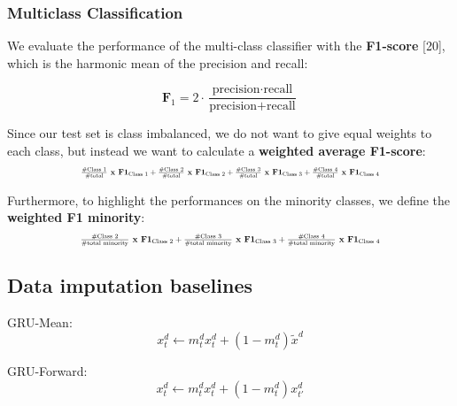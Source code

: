 \documentclass{article}
\begin{document}
\subsubsection*{\large Multiclass Classification}

We evaluate the performance of the multi-class classifier with the \textbf{F1-score} [20], which is the harmonic mean of the precision and recall:  

\begin{equation}
\textbf{F}_{1} = 2 \cdot \frac{\text{precision} \cdot \text{recall}}{ \text{precision} + \text{recall}}  
\end{equation}

\noindent Since our test set is class imbalanced, we do not want to give equal weights to each class, but instead we want to calculate a \textbf{weighted average F1-score}:  
\begin{equation}
\resizebox{0.7\hsize}{!}{$\frac{\#  \text{Class 1}}{\# \text{total}} \textbf{ x } \textbf{F1}_{\text{Class 1}} + \frac{\#  \text{Class 2}}{\# \text{total}} \textbf{ x } \textbf{F1}_{\text{Class 2}} + \frac{\#  \text{Class 3}}{\# \text{total}} \textbf{ x } \textbf{F1}_{\text{Class 3}} +  \frac{\#  \text{Class 4}}{\# \text{total}} \textbf{ x } \textbf{F1}_{\text{Class 4}}$}
\end{equation} 

\noindent Furthermore, to highlight the performances on the minority classes, we define the \textbf{weighted F1 minority}:
\begin{equation*}
\resizebox{0.7\hsize}{!}{$\frac{\#  \text{Class 2}}{\# \text{total minority}} \textbf{ x } \textbf{F1}_{\text{Class 2}} + \frac{\#  \text{Class 3}}{\# \text{total minority}} \textbf{ x } \textbf{F1}_{\text{Class 3}} +  \frac{\#  \text{Class 4}}{\# \text{total minority}} \textbf{ x } \textbf{F1}_{\text{Class 4}}$}
\end{equation*}  

\vspace{0.5cm}
\subsection{\large Data imputation baselines}
\vspace{0.4cm}
GRU-Mean: \begin{equation}
    x_{t}^{d} \xleftarrow{} m_{t}^{d} x_{t}^{d} + (1 - m_{t}^{d})\tilde{x}^{d}
\end{equation}

\noindent GRU-Forward: \begin{equation}
    x_{t}^{d} \xleftarrow{} m_{t}^{d} x_{t}^{d} + (1 - m_{t}^{d})x_{t'}^{d}
\end{equation}
\end{document}
